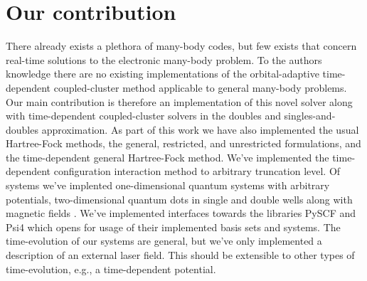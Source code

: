     \section{Our contribution}
        There already exists a plethora of many-body codes, but few exists that
        concern real-time solutions to the electronic many-body problem.
        To the authors knowledge there are no existing implementations of the
        orbital-adaptive time-dependent coupled-cluster method applicable to
        general many-body problems.
        Our main contribution is therefore an implementation of this novel
        solver along with time-dependent coupled-cluster solvers in the doubles
        and singles-and-doubles approximation.
        As part of this work we have also implemented the usual Hartree-Fock
        methods, the general, restricted, and unrestricted formulations, and the
        time-dependent general Hartree-Fock method.
        We've implemented the time-dependent configuration interaction method
        to arbitrary truncation level.
        Of systems we've implented one-dimensional quantum systems with
        arbitrary potentials, two-dimensional quantum dots in single and double
        wells along with magnetic fields \cite{greg-winther}.
        We've implemented interfaces towards the libraries PySCF \cite{pyscf}
        and Psi4 \cite{psi4} which opens for usage of their implemented basis
        sets and systems.
        The time-evolution of our systems are general, but we've only
        implemented a description of an external laser field.
        This should be extensible to other types of time-evolution, e.g., a
        time-dependent potential.

